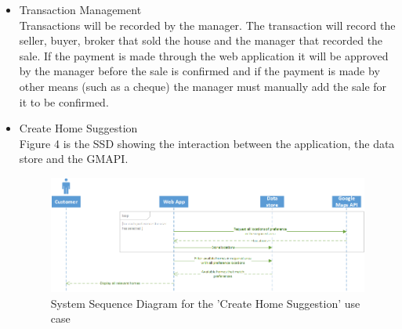 \documentclass[12pt]{article}
\begin{document}
\begin{itemize}
\item Transaction Management\\
Transactions will be recorded by the manager. The transaction will record the seller, buyer, broker that sold the house and the manager that recorded the sale. If the payment is made through the web application it will be approved by the manager before the sale is confirmed and if the payment is made by other means (such as a cheque)  the manager must manually add the sale for it to be confirmed.

\item Create Home Suggestion\\
Figure 4 is the SSD showing the interaction between the application, the data store and the GMAPI.

\begin{figure}[h]
\centering
\includegraphics[scale=0.7]{SSDCreateHomeSuggestion}
\caption{System Sequence Diagram for the 'Create Home Suggestion' use case}
\end{figure}
\end{itemize}
\end{document}
